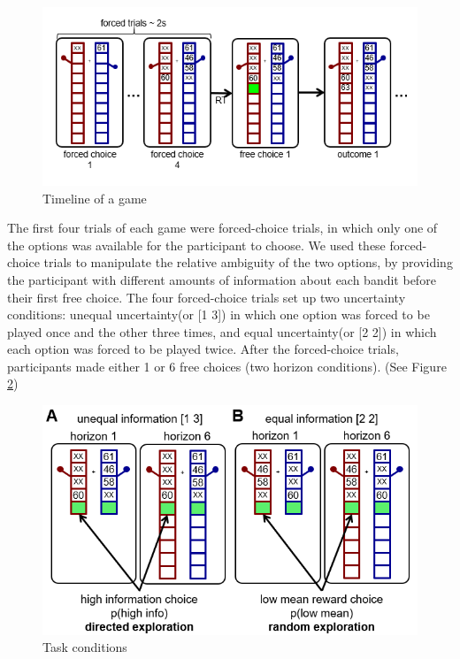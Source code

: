 \documentclass[12pt]{article}
\begin{document}
	\begin{figure}[H]
		\begin{center}
			\includegraphics[width=\textwidth]{figures/taskfig1.PNG}
			\caption{Timeline of a game}
			\label{fig:taskfig1}
		\end{center}
	\end{figure}
	
	The first four trials of each game were forced-choice trials, in which only one of the options was available for the participant to choose. We used these forced-choice trials to manipulate the relative ambiguity of the two options, by providing the participant with different amounts of information about each bandit before their first free choice. The four forced-choice trials set up two uncertainty conditions: unequal uncertainty(or [1 3]) in which one option was forced to be played once and the other three times, and equal uncertainty(or [2 2]) in which each option was forced to be played twice. After the forced-choice trials, participants made either 1 or 6 free choices (two horizon conditions). (See Figure \ref{fig:taskfig2})	 
	
	\begin{figure}[H]
		\begin{center}
			\includegraphics[width=\textwidth]{figures/taskfig2.PNG}
			\caption{Task conditions}
			\label{fig:taskfig2}
		\end{center}
	\end{figure}
	
\end{document}
